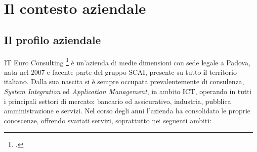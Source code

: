 
\chapter{Il contesto aziendale}
\label{cap:introduzione}

\section{Il profilo aziendale}

IT Euro Consulting \footcite{https://www.itecons.it} è un'azienda di medie dimensioni con sede legale a Padova, nata nel 2007 e facente parte del gruppo SCAI, presente su tutto il territorio italiano. 
Dalla sua nascita si è sempre occupata prevalentemente di consulenza, \textit{System Integration} ed \textit{Application Management}, in ambito ICT, operando in tutti i principali settori di mercato: bancario ed assicurativo, industria, pubblica amministrazione e servizi.
Nel corso degli anni l'azienda ha consolidato le proprie conoscenze, offrendo svariati servizi, soprattutto nei seguenti ambiti:
